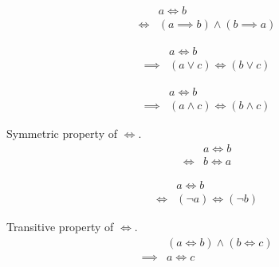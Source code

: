 \begin{prop}
\label{Proposition:iff_implies}
\begin{align*}
& a \iff b \\
\iff & (a \implies b) \land (b \implies a)
\end{align*}
\end{prop}

\begin{prop}
\label{Proposition:iff_lor}
\begin{align*}
& a \iff b \\
\implies & (a \lor c) \iff (b \lor c)
\end{align*}
\end{prop}

\begin{prop}
\label{Proposition:iff_land}
\begin{align*}
& a \iff b \\
\implies & (a \land c) \iff (b \land c)
\end{align*}
\end{prop}

\begin{prop}
\label{Proposition:iff_symmetric}
Symmetric property of $\iff$.
\begin{align*}
& a \iff b \\
\iff & b \iff a
\end{align*}
\end{prop}

\begin{prop}
\label{Proposition:iff_contrapositive}
\begin{align*}
& a \iff b \\
\iff & (\lnot a) \iff (\lnot b)
\end{align*}
\end{prop}

\begin{prop}
\label{Proposition:iff_transitive}
Transitive property of $\iff$.
\begin{align*}
& (a \iff b) \land (b \iff c) \\
\implies & a \iff c
\end{align*}
\end{prop}

